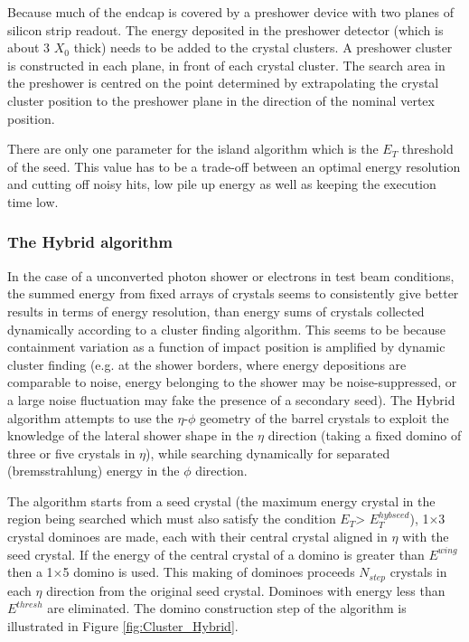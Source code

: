 Because much of the endcap is covered by a preshower device with two planes of silicon strip readout. The energy deposited in the preshower detector (which is about 3 $X_{0}$ thick) needs to be added to the crystal clusters. A preshower cluster is constructed in each plane, in front of each crystal cluster. The search area in the preshower is centred on the point determined by extrapolating the crystal cluster position to the preshower plane in the direction of the nominal vertex position.

There are only one parameter for the island algorithm which is the $E_{T}$ threshold of the seed. This value has to be a trade-off between an optimal energy resolution and cutting off noisy hits, low pile up energy as well as keeping the execution time low.

\subsubsection{The Hybrid algorithm}\label{subsec:Hybrid}

In the case of a unconverted photon shower or electrons in test beam conditions, the summed energy from fixed arrays of crystals seems to consistently give better results in terms of energy resolution, than energy sums of crystals collected dynamically according to a cluster finding algorithm. This seems to be because containment variation as a function of impact position is amplified by dynamic cluster finding (e.g. at the shower borders, where energy depositions are
comparable to noise, energy belonging to the shower may be noise-suppressed, or a large noise fluctuation may fake the presence of a secondary seed). The Hybrid algorithm attempts to use the $\eta$-$\phi$ geometry of the barrel crystals to exploit the knowledge of the lateral shower shape in the $\eta$ direction (taking a fixed domino of three or five crystals in $\eta$), while searching dynamically for separated (bremsstrahlung) energy in the $\phi$ direction.

The algorithm starts from a seed crystal (the maximum energy crystal in the region being searched which must also satisfy the condition $E_{T}$> $E_{T}^{hybseed}$), 1$\times$3 crystal dominoes are made, each with their central crystal aligned in $\eta$ with the seed crystal. If the energy of the central crystal of a domino
is greater than $E^{wing}$ then a 1$\times$5 domino is used. This making of dominoes proceeds $N_{step}$ crystals in each $\eta$ direction from the original seed crystal. Dominoes with energy less than $E^{thresh}$ are eliminated. The domino construction step of the algorithm is illustrated in Figure \ref{fig:Cluster_Hybrid}.

